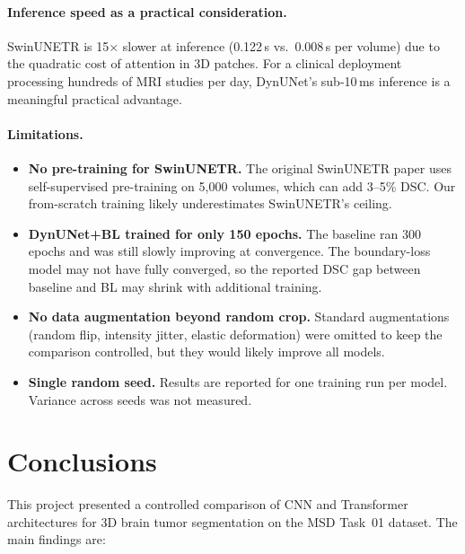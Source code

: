 \documentclass[12pt, letterpaper]{article}
\begin{document}
\paragraph{Inference speed as a practical consideration.}
SwinUNETR is 15$\times$ slower at inference (0.122\,s vs.\ 0.008\,s per volume)
due to the quadratic cost of attention in 3D patches.
For a clinical deployment processing hundreds of MRI studies per day, DynUNet's
sub-10\,ms inference is a meaningful practical advantage.

\paragraph{Limitations.}
\begin{itemize}[leftmargin=*]
    \item \textbf{No pre-training for SwinUNETR.}
          The original SwinUNETR paper uses self-supervised pre-training on 5{,}000
          volumes, which can add 3--5\% DSC.
          Our from-scratch training likely underestimates SwinUNETR's ceiling.
    \item \textbf{DynUNet+BL trained for only 150 epochs.}
          The baseline ran 300 epochs and was still slowly improving at convergence.
          The boundary-loss model may not have fully converged, so the reported
          DSC gap between baseline and BL may shrink with additional training.
    \item \textbf{No data augmentation beyond random crop.}
          Standard augmentations (random flip, intensity jitter, elastic deformation)
          were omitted to keep the comparison controlled, but they would likely
          improve all models.
    \item \textbf{Single random seed.}
          Results are reported for one training run per model.
          Variance across seeds was not measured.
\end{itemize}

\section{Conclusions}

This project presented a controlled comparison of CNN and Transformer architectures
for 3D brain tumor segmentation on the MSD Task~01 dataset.
The main findings are:
\end{document}

